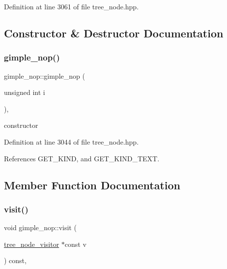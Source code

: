Definition at line 3061 of file tree\+\_\+node.\+hpp.



\subsection{Constructor \& Destructor Documentation}
\mbox{\label{structgimple__nop_aea8d9113e6467cf510fb1c6e1a4525bd}} 
\subsubsection{\texorpdfstring{gimple\+\_\+nop()}{gimple\_nop()}}
{\footnotesize\ttfamily gimple\+\_\+nop\+::gimple\+\_\+nop (\begin{DoxyParamCaption}\item[{unsigned int}]{i }\end{DoxyParamCaption})\hspace{0.3cm}{\ttfamily [inline]}, {\ttfamily [explicit]}}



constructor 



Definition at line 3044 of file tree\+\_\+node.\+hpp.



References G\+E\+T\+\_\+\+K\+I\+ND, and G\+E\+T\+\_\+\+K\+I\+N\+D\+\_\+\+T\+E\+XT.



\subsection{Member Function Documentation}
\mbox{\label{structgimple__nop_a332a68c582fd619f0fc2807fd90703d8}} 
\subsubsection{\texorpdfstring{visit()}{visit()}}
{\footnotesize\ttfamily void gimple\+\_\+nop\+::visit (\begin{DoxyParamCaption}\item[{\hyperlink{classtree__node__visitor}{tree\+\_\+node\+\_\+visitor} $\ast$const}]{v }\end{DoxyParamCaption}) const\hspace{0.3cm}{\ttfamily [override]}, {\ttfamily [virtual]}}



